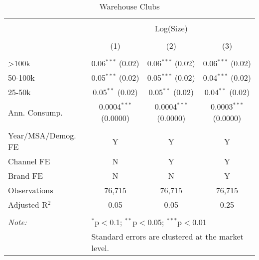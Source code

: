 
\begin{table}[!htbp] \centering 
  \caption{Warehouse Clubs} 
  \label{tab:packageSizeWarehouseDetergent} 
\begin{tabular}{@{\extracolsep{5pt}}lccc} 
\\[-1.8ex]\hline 
\hline \\[-1.8ex] 
 & \multicolumn{3}{c}{Log(Size)} \\ 
\\[-1.8ex] & (1) & (2) & (3)\\ 
\hline \\[-1.8ex] 
 >100k & 0.06$^{***}$ (0.02) & 0.06$^{***}$ (0.02) & 0.06$^{***}$ (0.02) \\ 
  50-100k & 0.05$^{***}$ (0.02) & 0.05$^{***}$ (0.02) & 0.04$^{***}$ (0.02) \\ 
  25-50k & 0.05$^{**}$ (0.02) & 0.05$^{**}$ (0.02) & 0.04$^{**}$ (0.02) \\ 
  Ann. Consump. & 0.0004$^{***}$ (0.0000) & 0.0004$^{***}$ (0.0000) & 0.0003$^{***}$ (0.0000) \\ 
 \hline \\[-1.8ex] 
Year/MSA/Demog. FE & Y & Y & Y \\ 
Channel FE & N & Y & Y \\ 
Brand FE & N & N & Y \\ 
Observations & 76,715 & 76,715 & 76,715 \\ 
Adjusted R$^{2}$ & 0.05 & 0.05 & 0.25 \\ 
\hline 
\hline \\[-1.8ex] 
\textit{Note:}  & \multicolumn{3}{l}{$^{*}$p$<$0.1; $^{**}$p$<$0.05; $^{***}$p$<$0.01} \\ 
 & \multicolumn{3}{l}{Standard errors are clustered at the market level.} \\ 
\end{tabular} 
\end{table} 
